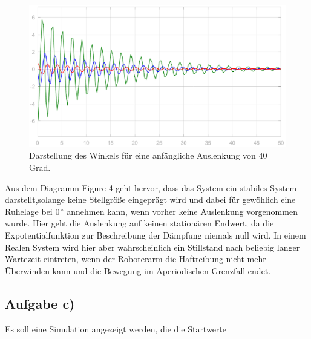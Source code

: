 \documentclass[10pt]{scrartcl}
\begin{document}
\begin{figure}[H]
	\centering
	\includegraphics[width=1\textwidth]{9b}
	\caption{Darstellung des Winkels für eine anfängliche Auslenkung von 40 Grad. }
	\label{img:grafik-dummy}
\end{figure}
Aus dem Diagramm Figure 4 geht hervor, dass das System ein stabiles System darstellt,solange keine Stellgröße eingeprägt wird und dabei für gewöhlich eine Ruhelage bei 0\,$^\circ$ annehmen kann, wenn vorher keine Auslenkung vorgenommen wurde. Hier geht die Auslenkung auf keinen stationären Endwert, da die Expotentialfunktion zur Beschreibung der Dämpfung niemals null wird. In einem Realen System wird hier aber wahrscheinlich ein Stillstand nach beliebig langer Wartezeit eintreten, wenn der Roboterarm die Haftreibung nicht mehr Überwinden kann und die Bewegung im Aperiodischen Grenzfall endet.

\newpage
\subsection{Aufgabe c)}
Es soll eine Simulation angezeigt werden, die die Startwerte 
\end{document}

